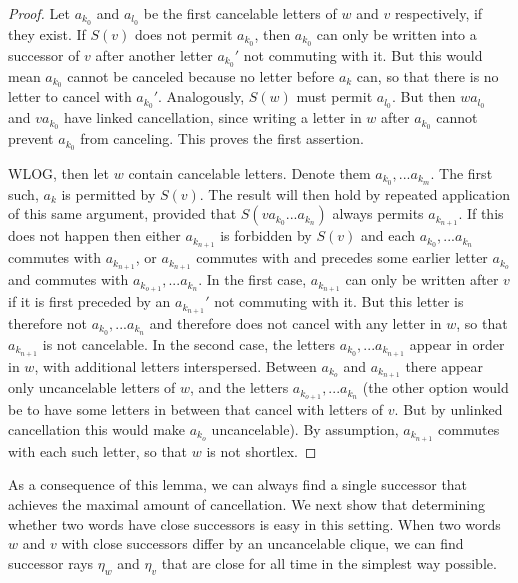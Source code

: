 \documentclass{amsart}
\theoremstyle{definition}
\theoremstyle{remark}
\begin{document}
	\begin{proof}
		
		Let $a_{k_0}$ and $a_{l_0}$ be the first cancelable letters of $w$ and $v$ respectively, if they exist. If $S(v)$ does not permit $a_{k_0}$, then  $a_{k_0}$ can only be written into a successor of $v$ after another letter $a_{k_0}'$ not commuting with it. But this would mean $a_{k_0}$ cannot be canceled because no letter before $a_k$ can, so that there is no letter to cancel with $a_{k_0}'$. Analogously, $S(w)$ must permit $a_{l_0}$. But then $wa_{l_0}$ and $va_{k_0}$ have linked cancellation, since writing a letter in $w$ after $a_{k_0}$ cannot prevent $a_{k_0}$ from canceling. This proves the first assertion.
		
		WLOG, then let $w$ contain cancelable letters. Denote them $a_{k_0}, ... a_{k_m}$. The first such, $a_k$ is permitted by $S(v)$. The result will then hold by repeated application of this same argument, provided that $S(va_{k_0} ... a_{k_n})$ always permits $a_{k_{n+1}}$. If this does not happen then either $a_{k_{n+1}}$ is forbidden by $S(v)$ and each $a_{k_0}, ... a_{k_n}$ commutes with $a_{k_{n+1}}$, or $a_{k_{n+1}}$ commutes with and precedes some earlier letter $a_{k_o}$ and commutes with $a_{k_{o+1}}, ... a_{k_n}$. In the first case, $a_{k_{n+1}}$ can only be written after $v$ if it is first preceded by an $a_{k_{n+1}}'$ not commuting with it. But this letter is therefore not $a_{k_0}, ... a_{k_n}$ and therefore does not cancel with any letter in $w$, so that $a_{k_{n+1}}$ is not cancelable. In the second case, the letters $a_{k_0}, ... a_{k_{n+1}}$ appear in order in $w$, with additional letters interspersed. Between $a_{k_{o}}$ and $a_{k_{n+1}}$ there appear only uncancelable letters of $w$, and the letters $a_{k_{o+1}}, ... a_{k_n}$ (the other option would be to have some letters in between that cancel with letters of $v$. But by unlinked cancellation this would make $a_{k_o}$ uncancelable). By assumption, $a_{k_{n+1}}$ commutes with each such letter, so that $w$ is not shortlex.
	\end{proof}
	
	As a consequence of this lemma, we can always find a single successor that achieves the maximal amount of cancellation. We next show that determining whether two words have close successors is easy in this setting. When two words $w$ and $v$ with close successors differ by an uncancelable clique, we can find successor rays $\eta_w$ and $\eta_v$ that are close for all time in the simplest way possible.
	
\end{document}
